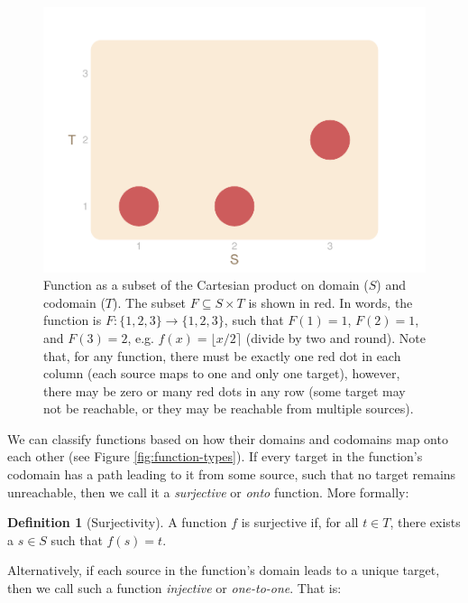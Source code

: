 \documentclass[
]{book}
\theoremstyle{definition}
\newtheorem{definition}{Definition}[chapter]
\theoremstyle{definition}
\theoremstyle{definition}
\theoremstyle{definition}
\theoremstyle{remark}
\begin{document}
\begin{figure}

{\centering \includegraphics{_main_files/figure-latex/function-subset-1} 

}

\caption{Function as a subset of the Cartesian product on domain ($S$) and codomain ($T$). The subset $F \subseteq S \times T$ is shown in red. In words, the function is $F: \{ 1, 2, 3 \} \to \{ 1, 2, 3 \}$, such that $F(1) = 1$, $F(2) = 1$, and $F(3) = 2$, e.g. $f(x) = \lfloor x / 2 \rceil$ (divide by two and round). Note that, for any function, there must be exactly one red dot in each column (each source maps to one and only one target), however, there may be zero or many red dots in any row (some target may not be reachable, or they may be reachable from multiple sources).}\label{fig:function-subset}
\end{figure}

We can classify functions based on how their domains and codomains map onto each other (see Figure \ref{fig:function-types}). If every target in the function's codomain has a path leading to it from some source, such that no target remains unreachable, then we call it a \emph{surjective} or \emph{onto} function. More formally:

\begin{definition}[Surjectivity]
A function \(f\) is surjective if, for all \(t \in T\), there exists a \(s \in S\) such that \(f(s) = t\).
\end{definition}

Alternatively, if each source in the function's domain leads to a unique target, then we call such a function \emph{injective} or \emph{one-to-one}. That is:
\end{document}
